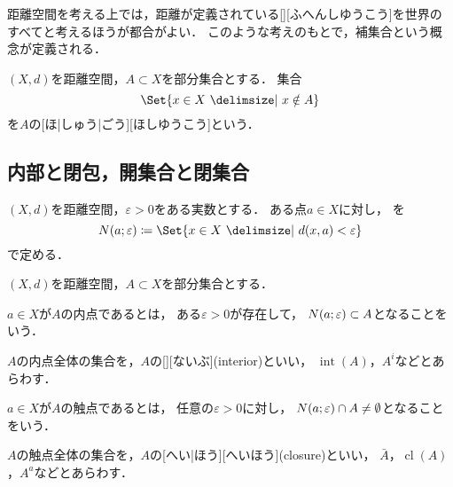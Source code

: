 \documentclass[../sotsu.tex]{subfiles}
\begin{document}
距離空間を考える上では，距離が定義されている[][ふへんしゆうこう]を世界のすべてと考えるほうが都合がよい．
このような考えのもとで，補集合という概念が定義される．

\begin{definition}
    $(X, d)$を距離空間，$A \subset X$を部分集合とする．
    集合
    \begin{equation*}
        \Set{  x \in X  \given  x \notin A  }
    \end{equation*}
    を$A$の[ほ|しゅう|ごう][ほしゆうこう]という．
\end{definition}




\subsection{内部と閉包，開集合と閉集合}


\begin{definition}
    $(X, d)$を距離空間，$\varepsilon > 0$をある実数とする．
    ある点$a \in X$に対し，%
    を
    \begin{equation}
        \neigh(a; \varepsilon) \coloneq \Set{  x \in X  \given  d(x, a) < \varepsilon  }
    \end{equation}
    で定める．
\end{definition}

$(X, d)$を距離空間，$A \subset X$を部分集合とする．

\begin{definition}
    \label{dfn:interior}
    $a \in X$が$A$の内点であるとは，
    ある$\varepsilon > 0$が存在して，
    $N(a; \varepsilon) \subset A$となることをいう．

    $A$の内点全体の集合を，$A$の[][ないぶ](interior)といい，
    $\operatorname{int}(A)$，$A^i$などとあらわす．
\end{definition}

\begin{definition}
    \label{dfn:closure}
    $a \in X$が$A$の触点であるとは，
    任意の$\varepsilon > 0$に対し，
    $N(a; \varepsilon) \cap A \neq \emptyset$となることをいう．

    $A$の触点全体の集合を，$A$の[へい|ほう][へいほう](closure)といい，
    $\bar{A}$，$\operatorname{cl}(A)$，$A^a$などとあらわす．
\end{definition}
\end{document}
